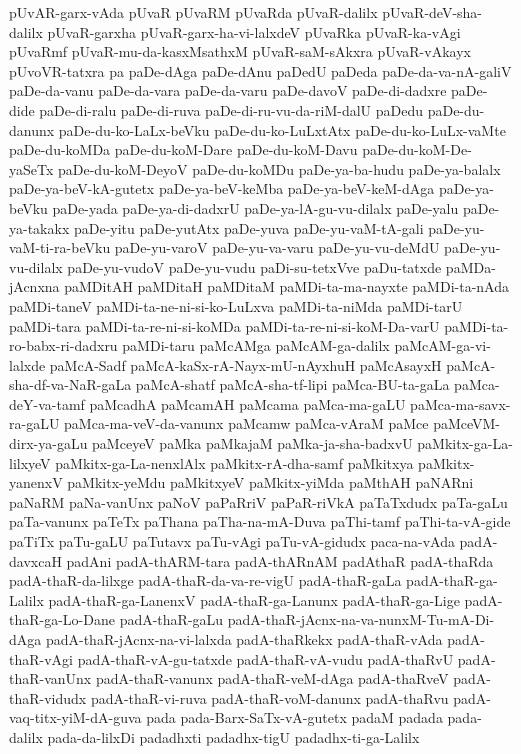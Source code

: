 {pUvAR-garx-vAda
pUvaR
pUvaRM
pUvaRda
pUvaR-dalilx
pUvaR-deV-sha-dalilx
pUvaR-garxha
pUvaR-garx-ha-vi-lalxdeV
pUvaRka
pUvaR-ka-vAgi
pUvaRmf
pUvaR-mu-da-kasxMsathxM
pUvaR-saM-sAkxra
pUvaR-vAkayx
pUvoVR-tatxra
pa
paDe-dAga
paDe-dAnu
paDedU
paDeda
paDe-da-va-nA-galiV
paDe-da-vanu
paDe-da-vara
paDe-da-varu
paDe-davoV
paDe-di-dadxre
paDe-dide
paDe-di-ralu
paDe-di-ruva
paDe-di-ru-vu-da-riM-dalU
paDedu
paDe-du-danunx
paDe-du-ko-LaLx-beVku
paDe-du-ko-LuLxtAtx
paDe-du-ko-LuLx-vaMte
paDe-du-koMDa
paDe-du-koM-Dare
paDe-du-koM-Davu
paDe-du-koM-De-yaSeTx
paDe-du-koM-DeyoV
paDe-du-koMDu
paDe-ya-ba-hudu
paDe-ya-balalx
paDe-ya-beV-kA-gutetx
paDe-ya-beV-keMba
paDe-ya-beV-keM-dAga
paDe-ya-beVku
paDe-yada
paDe-ya-di-dadxrU
paDe-ya-lA-gu-vu-dilalx
paDe-yalu
paDe-ya-takakx
paDe-yitu
paDe-yutAtx
paDe-yuva
paDe-yu-vaM-tA-gali
paDe-yu-vaM-ti-ra-beVku
paDe-yu-varoV
paDe-yu-va-varu
paDe-yu-vu-deMdU
paDe-yu-vu-dilalx
paDe-yu-vudoV
paDe-yu-vudu
paDi-su-tetxVve
paDu-tatxde
paMDa-jAcnxna
paMDitAH
paMDitaH
paMDitaM
paMDi-ta-ma-nayxte
paMDi-ta-nAda
paMDi-taneV
paMDi-ta-ne-ni-si-ko-LuLxva
paMDi-ta-niMda
paMDi-tarU
paMDi-tara
paMDi-ta-re-ni-si-koMDa
paMDi-ta-re-ni-si-koM-Da-varU
paMDi-ta-ro-babx-ri-dadxru
paMDi-taru
paMcAMga
paMcAM-ga-dalilx
paMcAM-ga-vi-lalxde
paMcA-Sadf
paMcA-kaSx-rA-Nayx-mU-nAyxhuH
paMcAsayxH
paMcA-sha-df-va-NaR-gaLa
paMcA-shatf
paMcA-sha-tf-lipi
paMca-BU-ta-gaLa
paMca-deY-va-tamf
paMcadhA
paMcamAH
paMcama
paMca-ma-gaLU
paMca-ma-savx-ra-gaLU
paMca-ma-veV-da-vanunx
paMcamw
paMca-vAraM
paMce
paMceVM-dirx-ya-gaLu
paMceyeV
paMka
paMkajaM
paMka-ja-sha-badxvU
paMkitx-ga-La-lilxyeV
paMkitx-ga-La-nenxlAlx
paMkitx-rA-dha-samf
paMkitxya
paMkitx-yanenxV
paMkitx-yeMdu
paMkitxyeV
paMkitx-yiMda
paMthAH
paNARni
paNaRM
paNa-vanUnx
paNoV
paPaRriV
paPaR-riVkA
paTaTxdudx
paTa-gaLu
paTa-vanunx
paTeTx
paThana
paTha-na-mA-Duva
paThi-tamf
paThi-ta-vA-gide
paTiTx
paTu-gaLU
paTutavx
paTu-vAgi
paTu-vA-gidudx
paca-na-vAda
padA-davxcaH
padAni
padA-thARM-tara
padA-thARnAM
padAthaR
padA-thaRda
padA-thaR-da-lilxge
padA-thaR-da-va-re-vigU
padA-thaR-gaLa
padA-thaR-ga-Lalilx
padA-thaR-ga-LanenxV
padA-thaR-ga-Lanunx
padA-thaR-ga-Lige
padA-thaR-ga-Lo-Dane
padA-thaR-gaLu
padA-thaR-jAcnx-na-va-nunxM-Tu-mA-Di-dAga
padA-thaR-jAcnx-na-vi-lalxda
padA-thaRkekx
padA-thaR-vAda
padA-thaR-vAgi
padA-thaR-vA-gu-tatxde
padA-thaR-vA-vudu
padA-thaRvU
padA-thaR-vanUnx
padA-thaR-vanunx
padA-thaR-veM-dAga
padA-thaRveV
padA-thaR-vidudx
padA-thaR-vi-ruva
padA-thaR-voM-danunx
padA-thaRvu
padA-vaq-titx-yiM-dA-guva
pada
pada-Barx-SaTx-vA-gutetx
padaM
padada
pada-dalilx
pada-da-lilxDi
padadhxti
padadhx-tigU
padadhx-ti-ga-Lalilx
}

